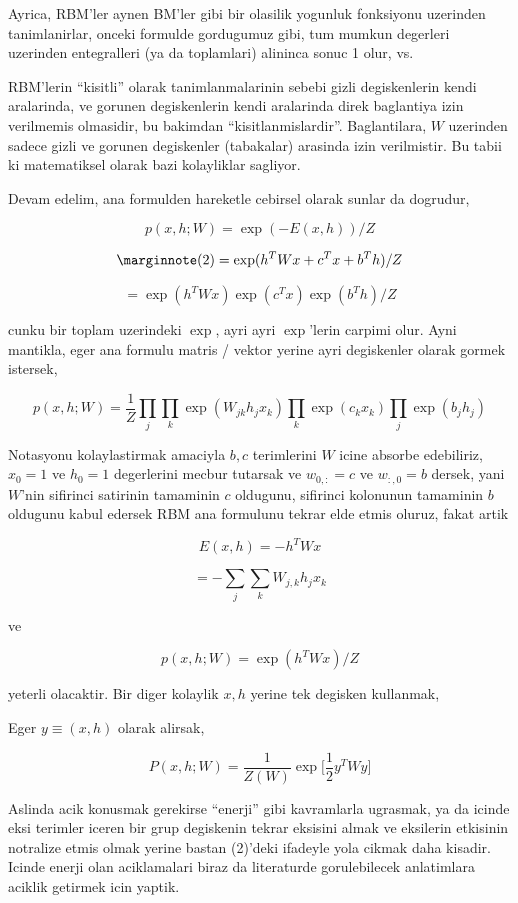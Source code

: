 \documentclass[12pt,fleqn]{article}\usepackage{../common}
\begin{document}
Ayrica, RBM'ler aynen BM'ler gibi bir olasilik yogunluk fonksiyonu
uzerinden tanimlanirlar, onceki formulde gordugumuz gibi, tum mumkun
degerleri uzerinden entegralleri (ya da toplamlari) alininca sonuc 1 olur,
vs.

RBM'lerin ``kisitli'' olarak tanimlanmalarinin sebebi gizli degiskenlerin
kendi aralarinda, ve gorunen degiskenlerin kendi aralarinda direk
baglantiya izin verilmemis olmasidir, bu bakimdan
``kisitlanmislardir''. Baglantilara, $W$ uzerinden sadece gizli ve gorunen
degiskenler (tabakalar) arasinda izin verilmistir. Bu tabii ki matematiksel
olarak bazi kolayliklar sagliyor.

Devam edelim, ana formulden hareketle cebirsel olarak sunlar da dogrudur,

$$ p(x,h;W) = \exp (-E(x,h)) / Z $$

$$ 
\mlabel{2}
= \exp (h^TWx + c^Tx + b^Th ) / Z $$

$$ = \exp (h^TWx) \exp (c^Tx) \exp(b^Th) / Z $$

cunku bir toplam uzerindeki $\exp$, ayri ayri $\exp$'lerin carpimi
olur. Ayni mantikla, eger ana formulu matris / vektor yerine ayri
degiskenler olarak gormek istersek,

$$ 
p(x,h;W) = \frac{1}{Z}
\prod_j \prod_k \exp (W_{jk}h_jx_k) \prod_k \exp(c_kx_k) \prod_j \exp(b_jh_j) 
 $$

 Notasyonu kolaylastirmak amaciyla $b,c$ terimlerini $W$ icine absorbe
 edebiliriz, $x_0=1$ ve $h_0=1$ degerlerini mecbur tutarsak ve $w_{0,:}=c$
 ve $w_{:,0}=b$ dersek, yani $W$'nin sifirinci satirinin tamaminin $c$
 oldugunu, sifirinci kolonunun tamaminin $b$ oldugunu kabul edersek
 RBM ana formulunu tekrar elde etmis oluruz, fakat artik

$$ E(x,h) = -h^TWx $$


$$ = - \sum_j \sum_k W_{j,k}h_jx_k  $$

ve

$$ p(x,h;W)  = \exp (h^TWx) / Z $$

yeterli olacaktir. Bir diger kolaylik $x,h$ yerine tek degisken kullanmak,

Eger $y \equiv (x,h)$ olarak alirsak, 


$$ P(x,h;W) = \frac{1}{Z(W)} \exp 
\bigg[ 
\frac{1}{2} y^T W y
\bigg]
$$

Aslinda acik konusmak gerekirse ``enerji'' gibi kavramlarla ugrasmak, ya da
icinde eksi terimler iceren bir grup degiskenin tekrar eksisini almak ve
eksilerin etkisinin notralize etmis olmak yerine bastan (2)'deki ifadeyle
yola cikmak daha kisadir. Icinde enerji olan aciklamalari biraz da
literaturde gorulebilecek anlatimlara aciklik getirmek icin yaptik.
\end{document}
